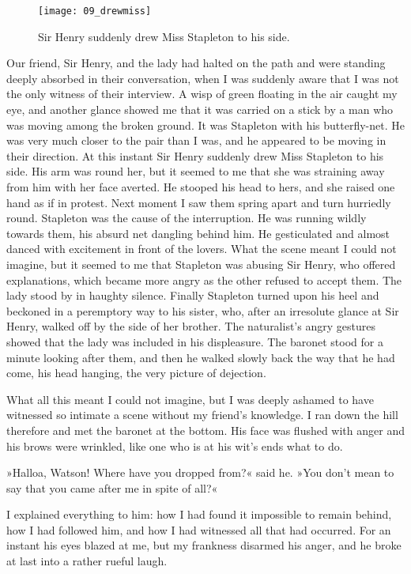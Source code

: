 \begin{figure}[h!]
\centering
\texttt{[image: 09\_drewmiss]}
\caption{Sir Henry suddenly drew Miss Stapleton to his side.}
\end{figure}

Our friend, Sir Henry, and the lady had halted on the path and were standing deeply absorbed in their conversation, when I was suddenly aware that I was not the only witness of their interview. A wisp of green floating in the air caught my eye, and another glance showed me that it was carried on a stick by a man who was moving among the broken ground. It was Stapleton with his butterfly-net. He was very much closer to the pair than I was, and he appeared to be moving in their direction. At this instant Sir Henry suddenly drew Miss Stapleton to his side. His arm was round her, but it seemed to me that she was straining away from him with her face averted. He stooped his head to hers, and she raised one hand as if in protest. Next moment I saw them spring apart and turn hurriedly round. Stapleton was the cause of the interruption. He was running wildly towards them, his absurd net dangling behind him. He gesticulated and almost danced with excitement in front of the lovers. What the scene meant I could not imagine, but it seemed to me that Stapleton was abusing Sir Henry, who offered explanations, which became more angry as the other refused to accept them. The lady stood by in haughty silence. Finally Stapleton turned upon his heel and beckoned in a peremptory way to his sister, who, after an irresolute glance at Sir Henry, walked off by the side of her brother. The naturalist's angry gestures showed that the lady was included in his displeasure. The baronet stood for a minute looking after them, and then he walked slowly back the way that he had come, his head hanging, the very picture of dejection.

What all this meant I could not imagine, but I was deeply a\-shamed to have witnessed so intimate a scene without my friend's knowledge. I ran down the hill therefore and met the baronet at the bottom. His face was flushed with anger and his brows were wrin\-kled, like one who is at his wit's ends what to do.

»Halloa, Watson! Where have you dropped from?« said he. »You don't mean to say that you came after me in spite of all?«

I explained everything to him: how I had found it impossible to remain behind, how I had followed him, and how I had witnessed all that had occurred. For an instant his eyes blazed at me, but my frankness disarmed his anger, and he broke at last into a rather rueful laugh.

